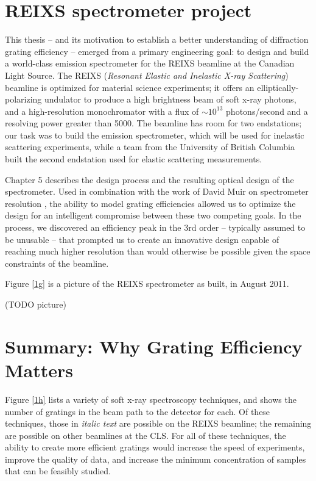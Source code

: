 \section{REIXS spectrometer project}
This thesis -- and its motivation to establish a better understanding of diffraction grating efficiency -- emerged from a primary engineering goal: to design and build a world-class emission spectrometer for the REIXS beamline at the Canadian Light Source.  The REIXS (\emph{Resonant Elastic and Inelastic X-ray Scattering}) beamline is optimized for material science experiments; it offers an elliptically-polarizing undulator to produce a high brightness beam of soft x-ray photons, and a high-resolution monochromator with a flux of $\sim10^{13}$ photons/second and a resolving power greater than 5000.  The beamline has room for two endstations; our task was to build the emission spectrometer, which will be used for inelastic scattering experiments, while a team from the University of British Columbia built the second endstation used for elastic scattering measurements.

Chapter 5 describes the design process and the resulting optical design of the spectrometer.  Used in combination with the work of David Muir on spectrometer resolution \cite{Mui06}, the ability to model grating efficiencies allowed us to optimize the design for an intelligent compromise between these two competing goals.  In the process, we discovered an efficiency peak in the 3rd order -- typically assumed to be unusable -- that prompted us to create an innovative design capable of reaching much higher resolution than would otherwise be possible given the space constraints of the beamline.

Figure \ref{1g} is a picture of the REIXS spectrometer as built, in August 2011.

(TODO picture)

 \section{Summary: Why Grating Efficiency Matters}
 Figure \ref{1h} lists a variety of soft x-ray spectroscopy techniques, and shows the number of gratings in the beam path to the detector for each.  Of these techniques, those in \emph{italic text} are possible on the REIXS beamline; the remaining are possible on other beamlines at the CLS.  For all of these techniques, the ability to create more efficient gratings would increase the speed of experiments, improve the quality of data, and increase the minimum concentration of samples that can be feasibly studied.
 
